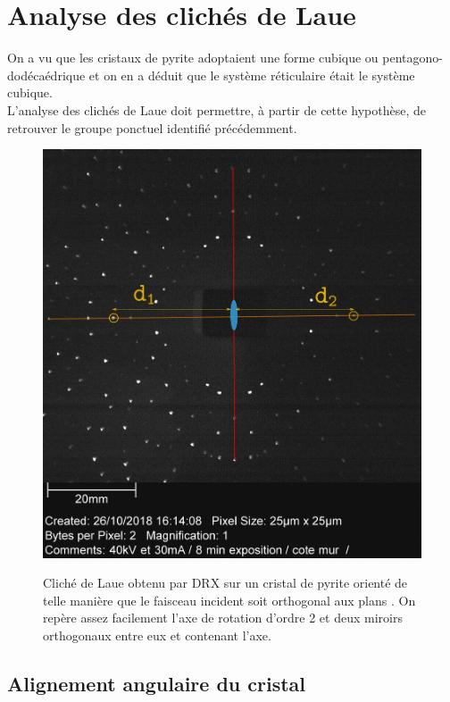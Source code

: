 \section{Analyse des clichés de Laue}

On a vu que les cristaux de pyrite  adoptaient une forme cubique ou pentagono-dodécaédrique et on en a déduit que le système réticulaire était le système cubique. \\
L'analyse des clichés de Laue doit permettre, à partir de cette hypothèse, de retrouver le groupe ponctuel identifié précédemment.

\begin{figure}
\caption{Cliché de Laue obtenu par DRX sur un cristal de pyrite orienté de telle manière que le faisceau incident soit orthogonal aux plans . On repère assez facilement l'axe de rotation d'ordre 2 et deux miroirs orthogonaux entre eux et contenant l'axe.}
\includegraphics[width=0.85\columnwidth]{figures/Laue_Pyrite_3_symetries}
\label{fig:laueCliche}
\end{figure}

\subsection{Alignement angulaire du cristal}

